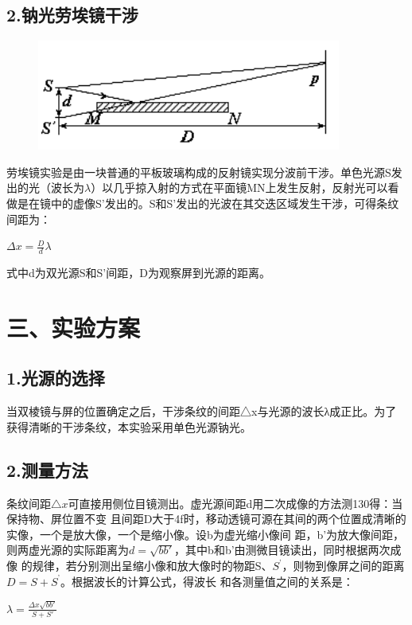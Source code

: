 \documentclass[11pt,a4paper,oneside]{article}
\begin{document}
\subsection*{2.钠光劳埃镜干涉}

\begin{figure}[htbp]
 \centering
  \includegraphics[width=10cm]{Image/laoai.png}
\end{figure}

劳埃镜实验是由一块普通的平板玻璃构成的反射镜实现分波前干涉。单色光源S发出的光（波长为$\lambda$）以几乎掠入射的方式在平面镜MN上发生反射，反射光可以看做是在镜中的虚像S’发出的。S和S’发出的光波在其交迭区域发生干涉，可得条纹间距为：

\begin{center}
$\Delta x=\displaystyle\frac{D}{d}\lambda$
\end{center}
   
式中d为双光源S和S’间距，D为观察屏到光源的距离。

\section*{三、实验方案}

\subsection*{1.光源的选择} 
 当双棱镜与屏的位置确定之后，干涉条纹的间距△x与光源的波长λ成正比。为了获得清晰的干涉条纹，本实验采用单色光源钠光。

\subsection*{2.测量方法}
 条纹间距${\bigtriangleup}{x}$可直接用侧位目镜测出。虚光源间距d用二次成像的方法测130得：当保持物、屏位置不变
 且间距D大于4f时，移动透镜可源在其间的两个位置成清晰的实像，一个是放大像，一个是缩小像。设b为虚光缩小像间
 距，b’为放大像间距，则两虚光源的实际距离为$d=\sqrt{b{b}'}$，其中b和b’由测微目镜读出，同时根据两次成像
 的规律，若分别测出呈缩小像和放大像时的物距S、$S^’$，则物到像屏之间的距离$D=S+S^’$。根据波长的计算公式，得波长
 和各测量值之间的关系是：
 \begin{center}
 $\lambda =\displaystyle\frac{\Delta x\sqrt{b{b}'}}{S+{S}'}$\\
 \end{center}
 
\end{document}
